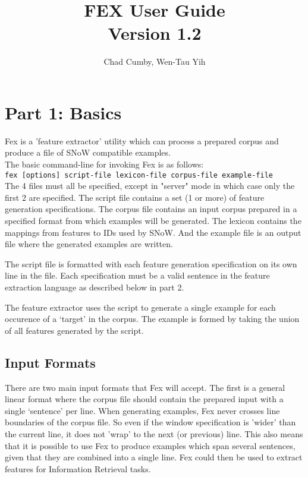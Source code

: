 \documentclass[11pt]{article}
\begin{document}
\title{FEX User Guide\\ Version 1.2}
\author{ Chad Cumby, Wen-Tau Yih }

\maketitle

\section*{Part 1: Basics}

Fex is a 'feature extractor' utility which can process a prepared
corpus and produce a file of SNoW compatible examples. \\
The basic command-line for invoking Fex is as follows: \\

{\tt fex [options] script-file lexicon-file corpus-file example-file} \\

\noindent The 4 files must all be specified, except in "server" mode in which case
only the first 2 are specified.  The script file contains a set 
(1 or more) of feature generation specifications.  The corpus file contains an 
input corpus prepared in a specified format from which examples will be 
generated.  The lexicon contains the mappings from features to IDs used by SNoW.  
And the example file is an output file where the generated examples are 
written.

The script file is formatted with each feature generation specification 
on its own line in the file.  Each specification must be a valid sentence 
in the feature extraction language as described below in part 2.

The feature extractor uses the script to generate a single example for each 
occurence of a `target' in the corpus.  The example is formed by taking 
the union of all features generated by the script.

\subsection*{Input Formats}

There are two main input formats that Fex will accept.  The first is a general 
linear format where the corpus file should contain the prepared input with a 
single `sentence' per
line.  When generating examples, Fex never crosses line boundaries of the 
corpus file.  So even if the window specification is 'wider' than the 
current line, it does not 'wrap' to the next (or previous) line.  This also
means that it is possible to use Fex to produce examples which span several
sentences, given that they are combined into a single line.  Fex could then be
used to extract features for Information Retrieval tasks.
\end{document}
